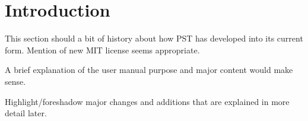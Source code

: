 \vspace{2em} %
\chapter*{Introduction}

This section should a bit of history about how PST has developed into its current form.
Mention of new MIT license seems appropriate.


A brief explanation of the user manual purpose and major content would make sense.


Highlight/foreshadow major changes and additions that are explained in more detail later.
